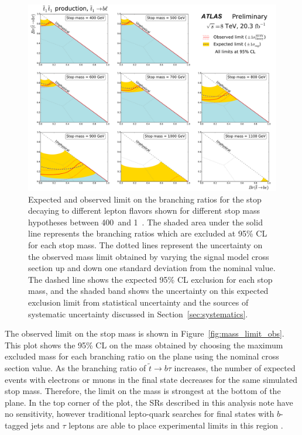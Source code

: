\begin{figure}[ht]
  \centering
  \includegraphics[width=\textwidth]{figs/blstop/limit_contours.pdf}
  \caption{Expected and observed limit on the branching ratios for the stop
    decaying to different lepton flavors shown for different stop mass
    hypotheses between 400~\GeV and 1~\TeV. The shaded area under the solid
    line represents the branching ratios which are excluded at 95\% CL
    for each stop mass.
    The dotted lines represent the uncertainty on the observed mass limit
    obtained by varying the signal model cross section up and down one standard
    deviation from the nominal value. The dashed line shows the
    expected 95\% CL exclusion for each stop mass, and the shaded band shows
    the uncertainty on this expected exclusion limit from statistical
    uncertainty and the sources of systematic uncertainty discussed in
    Section~\ref{sec:systematics}.
  }
  \label{fig:limit_contours}
\end{figure}

The observed limit on the stop mass is shown in Figure~\ref{fig:mass_limit_obs}.
This plot shows the 95\% CL on the mass obtained by choosing
the maximum excluded mass for each branching ratio on the plane using the
nominal cross section value.  
As the branching ratio of $\tilde{t} \rightarrow b\tau$ increases, the number of
expected events with electrons or muons in the final state decreases for the
same simulated stop mass.
Therefore, the limit on the mass is strongest at the bottom of the plane.
In the top corner of the plot, the SRs described in this analysis note have no
sensitivity, however traditional lepto-quark searches for final states with
$b$-tagged jets and $\tau$ leptons are able to place experimental limits in this
region \cite{ATLAS:2013oea}.

